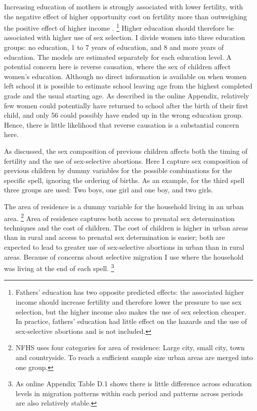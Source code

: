 \documentclass[12pt,letterpaper]{article}
\begin{document}
Increasing education of mothers is strongly associated with lower fertility, with
the negative effect of higher opportunity cost on fertility more than outweighing the 
positive effect of higher income \citep{schultz97}.%
\footnote{
Fathers' education has two opposite predicted effects: the associated higher income
should increase fertility and therefore lower the pressure to use sex selection, but
the higher income also makes the use of sex selection cheaper.
In practice, fathers' education had little effect on the hazards and the use of 
sex-selective abortions and is not included.
}
Higher education should therefore be associated with higher use of sex selection.
I divide women into three education groups:
no education, 1 to 7 years of education, and 8 and more years of education.
The models are estimated separately for each education level.
A potential concern here is reverse causation, where the sex of children
affect women's education.
Although no direct information is available on when women left school it is
possible to estimate school leaving age from the highest completed grade
and the usual starting age.
As described in the online Appendix, relatively few women could potentially 
have returned to school after the birth of their first child,
and only 56 could possibly have ended up in the wrong education group. 
Hence, there is little likelihood that reverse causation is a substantial
concern here.

As discussed, the sex composition of previous children affects both the timing
of fertility and the use of sex-selective abortions.
Here I capture sex composition of previous children by dummy variables for the
possible combinations for the specific spell, ignoring the ordering of births.
As an example, for the third spell three groups are used: Two boys,
one girl and one boy, and two girls.

The area of residence is a dummy variable for the household living in
an urban area.%
\footnote{
NFHS uses four categories for area of residence: Large city, small city, town
and countryside.
To reach a sufficient sample size urban areas are merged into one group.
}
Area of residence captures both access to prenatal sex determination techniques 
and the cost of children.
The cost of children is higher in urban areas than in rural and access to prenatal
sex determination is easier;
both are expected to lead to greater use of sex-selective abortions in urban than 
in rural areas.
Because of concerns about selective migration I use where the household was living
at the end of each spell.%
\footnote{
As online Appendix Table D.1 shows there is little difference across
education levels in migration patterns within each period and patterns across periods
are also relatively stable.
}
\end{document}
